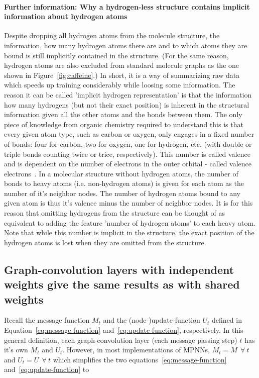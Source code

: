 \paragraph{Further information: Why a hydrogen-less structure contains implicit information about hydrogen atoms}
Despite dropping all hydrogen atoms from the molecule structure, the information, how many hydrogen atoms there are and to which atoms they are bound is still implicitly contained in the structure. (For the same reason, hydrogen atoms are also excluded from standard molecule graphs as the one shown in Figure~\ref{fig:caffeine}.) In short, it is a way of summarizing raw data which speeds up training considerably while loosing some information. The reason it can be called 'implicit hydrogen representation' is that the information how many hydrogens (but not their exact position) is inherent in the structural information given all the other atoms and the bonds between them. The only piece of knowledge from organic chemistry required to understand this is that every given atom type, such as carbon or oxygen, only engages in a fixed number of bonds: four for carbon, two for oxygen, one for hydrogen, etc. (with double or triple bonds counting twice or trice, respectively). This number is called valence and is dependent on the number of electrons in the outer orbital - called valence electrons~\cite{Organic-chemistry}. In a molecular structure without hydrogen atoms, the number of bonds to heavy atoms (i.e. non-hydrogen atoms) is given for each atom as the number of it's neighbor nodes. The number of hydrogen atoms bound to any given atom is thus it's valence minus the number of neighbor nodes. It is for this reason that omitting hydrogens from the structure can be thought of as equivalent to adding the feature 'number of hydrogen atoms' to each heavy atom. Note that while this number is implicit in the structure, the exact position of the hydrogen atoms is lost when they are omitted from the structure.



\subsection{Graph-convolution layers with independent weights give the same results as with shared weights}
\label{sec:weight-sharing}

Recall the message function $M_t$ and the (node-)update-function $U_t$ defined in Equation~\ref{eq:message-function} and~\ref{eq:update-function}, respectively. In this general definition, each graph-convolution layer (each message passing step) $t$ has it's own $M_t$ and $U_t$. However, in most implementations of MPNNs, $M_t = M~~\forall~t$ and $U_t = U~~\forall~t$ which simplifies the two equations~\ref{eq:message-function} and~\ref{eq:update-function} to

